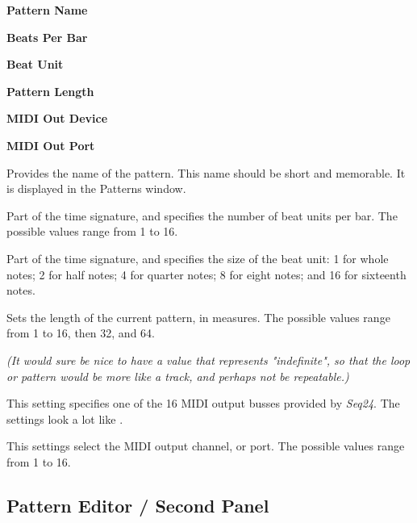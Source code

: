    \begin{enumber}
      \item \textbf{Pattern Name}
      \item \textbf{Beats Per Bar}
      \item \textbf{Beat Unit}
      \item \textbf{Pattern Length}
      \item \textbf{MIDI Out Device}
      \item \textbf{MIDI Out Port}
   \end{enumber}

   \setcounter{ItemCounter}{0}      %

   Provides the name of the pattern.
   This name should be short and memorable.
   It is displayed in the Patterns window.

   Part of the time signature, and specifies the number of beat units per bar.
   The possible values range from 1 to 16.

   Part of the time signature, and specifies the size of the beat unit:
   1 for whole notes; 2 for half notes; 4 for quarter notes; 8 for eight notes;
   and 16 for sixteenth notes.

   Sets the length of the current pattern, in measures.
   The possible values range from 1 to 16, then 32, and 64.

   \textsl{(It would sure be nice to have a value that represents
   "indefinite", so that the loop or pattern would be more like a track,
   and perhaps not be repeatable.)}

   This setting specifies one of the 16 MIDI output busses provided by
   \textsl{Seq24}.  The settings look a lot like
   .

   This settings select the MIDI output channel, or port.
   The possible values range from 1 to 16.

\subsection{Pattern Editor / Second Panel}
\label{subsec:seq24_pattern_editor_second}

